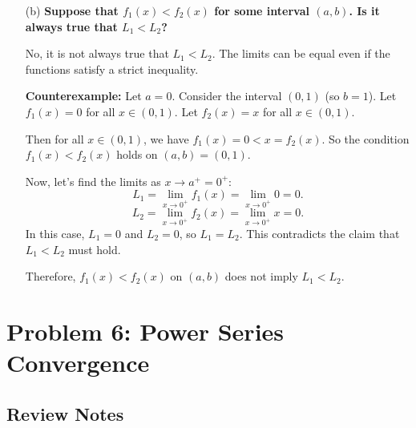 \documentclass{article}
\begin{document}
\begin{enumerate}
  \item[(b)] \textbf{Suppose that \(f_1(x) < f_2(x)\) for some interval \((a,b)\). Is it always true that \(L_1 < L_2\)?}

    No, it is not always true that \(L_1 < L_2\). The limits can be equal even if the functions satisfy a strict inequality.

    \textbf{Counterexample:}
    Let \(a = 0\). Consider the interval \((0, 1)\) (so \(b=1\)).
    Let \(f_1(x) = 0\) for all \(x \in (0, 1)\).
    Let \(f_2(x) = x\) for all \(x \in (0, 1)\).

    Then for all \(x \in (0, 1)\), we have \(f_1(x) = 0 < x = f_2(x)\). So the condition \(f_1(x) < f_2(x)\) holds on \((a,b) = (0, 1)\).

    Now, let's find the limits as \(x \to a^+ = 0^+\):
    \[ L_1 = \lim_{x\to 0^+} f_1(x) = \lim_{x\to 0^+} 0 = 0. \]
    \[ L_2 = \lim_{x\to 0^+} f_2(x) = \lim_{x\to 0^+} x = 0. \]
    In this case, \(L_1 = 0\) and \(L_2 = 0\), so \(L_1 = L_2\).
    This contradicts the claim that \(L_1 < L_2\) must hold.

    Therefore, \(f_1(x) < f_2(x)\) on \((a,b)\) does not imply \(L_1 < L_2\).
\end{enumerate}

\section*{Problem 6: Power Series Convergence}

\subsection*{Review Notes}
\end{document}
